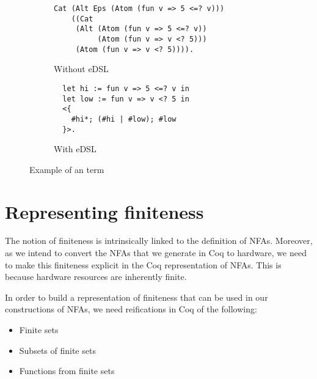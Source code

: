 \begin{figure}
  \centering
  \begin{subfigure}{0.5\linewidth}
  \centering
\begin{verbatim}
Cat (Alt Eps (Atom (fun v => 5 <=? v)))
    ((Cat
     (Alt (Atom (fun v => 5 <=? v))
          (Atom (fun v => v <? 5)))
     (Atom (fun v => v <? 5)))).
\end{verbatim}
\caption{Without \gls{eDSL}}
\label{code:edsl-eg-no}
\end{subfigure}%
%
\begin{subfigure}{0.5\linewidth}
  \centering
\begin{verbatim}
  let hi := fun v => 5 <=? v in
  let low := fun v => v <? 5 in
  <{
    #hi*; (#hi | #low); #low
  }>.
\end{verbatim}
\caption{With \gls{eDSL}}
\label{code:edsl-eg-yes}
\end{subfigure}
\caption{Example of an  term}
\label{code:edsl-eg}
\end{figure}

\section{Representing finiteness} \label{sec:repr-finset}
The notion of finiteness is intrinsically linked to the definition of
\glspl{NFA}.
Moreover, as we intend to convert the \glspl{NFA} that we generate in
Coq to hardware,
we need to make this finiteness explicit in the Coq representation of
\glspl{NFA}.
This is because hardware resources are inherently finite.

In order to build a representation of finiteness that can be used in
our constructions of \glspl{NFA},
we need reifications in Coq of the following:

\begin{itemize}
\item Finite sets
\item Subsets of finite sets
\item Functions from finite sets
\end{itemize}

